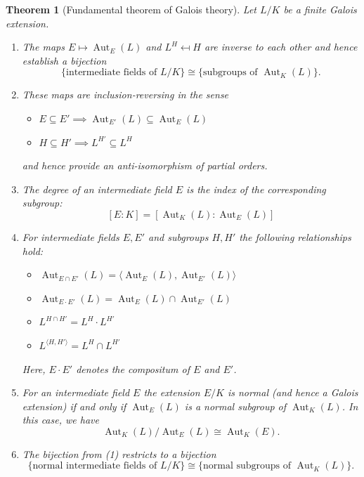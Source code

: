 \documentclass[11pt,reqno]{amsart}
\theoremstyle{standard}
\newtheorem{thm}[lemma]{Theorem}
\theoremstyle{definition}
\DeclareMathOperator{\Aut}{Aut}
\begin{document}
\begin{thm}[Fundamental theorem of Galois theory]\label{fundamental}
Let $L/K$ be a finite Galois extension.
\begin{enumerate}
\item\label{correspondence} The maps $E \mapsto \Aut_E(L)$ and $L^H \mapsfrom H$ are inverse to each other and hence establish a bijection
\[\bigl\{\text{intermediate fields of } L/K\bigr\} \cong \bigl\{\text{subgroups of } \Aut_K(L)\bigr\}.\]
\item These maps are inclusion-reversing in the sense
\begin{itemize}
\item $E \subseteq E' \implies \Aut_{E'}(L) \subseteq \Aut_E(L)$
\item $H \subseteq H' \implies L^{H'} \subseteq L^H$
\end{itemize}
and hence provide an anti-isomorphism of partial orders.
\item The degree of an intermediate field $E$ is the index of the corresponding subgroup:
\[[E:K] = [\Aut_K(L) : \Aut_E(L)]\]
\item For intermediate fields $E,E'$ and subgroups $H,H'$ the following relationships hold:
\begin{itemize}
\item $\Aut_{E \cap E'}(L) = \langle \Aut_E(L),\Aut_{E'}(L) \rangle$
\item $\Aut_{E \cdot E'}(L) = \Aut_E(L) \cap \Aut_{E'}(L)$
\item $L^{H \cap H'} = L^H \cdot L^{H'}$
\item $L^{\langle H,H' \rangle} = L^H \cap L^{H'}$
\end{itemize}
Here, $E \cdot E'$ denotes the compositum of $E$ and $E'$.
\item For an intermediate field $E$ the extension $E/K$ is normal (and hence a Galois extension) if and only if $\Aut_E(L)$ is a normal subgroup of $\Aut_K(L)$. In this case, we have
\[\Aut_K(L) / \Aut_E(L) \cong \Aut_K(E).\]
\item The bijection from (1) restricts to a bijection
\[\bigl\{\text{normal intermediate fields of } L/K\bigr\} \cong \bigl\{\text{normal subgroups of } \Aut_K(L)\bigr\}.\]
\end{enumerate}
\end{thm}
\end{document}
